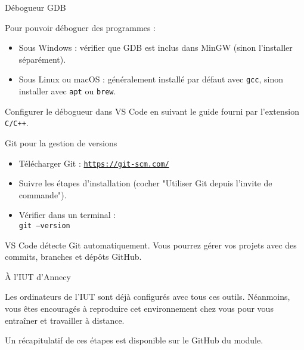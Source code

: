 \documentclass[TP, noCustomPackages]{UPSTI_Document}
\begin{document}
\begin{UPSTIinfor}{Débogueur GDB}

Pour pouvoir déboguer des programmes :
\begin{itemize}
    \item Sous Windows : vérifier que GDB est inclus dans MinGW (sinon l’installer séparément).
    \item Sous Linux ou macOS : généralement installé par défaut avec \texttt{gcc}, sinon installer avec \texttt{apt} ou \texttt{brew}.
\end{itemize}
Configurer le débogueur dans VS Code en suivant le guide fourni par l’extension \texttt{C/C++}.

\end{UPSTIinfor}

\begin{UPSTIinfor}{Git pour la gestion de versions}

\begin{itemize}
    \item Télécharger Git : \href{https://git-scm.com/}{\texttt{https://git-scm.com/}}
    \item Suivre les étapes d’installation (cocher "Utiliser Git depuis l'invite de commande").
    \item Vérifier dans un terminal :\\
    \texttt{git --version}
\end{itemize}

VS Code détecte Git automatiquement. Vous pourrez gérer vos projets avec des commits, branches et dépôts GitHub.

\end{UPSTIinfor}

\begin{UPSTIinfor}{À l'IUT d'Annecy}

Les ordinateurs de l'IUT sont déjà configurés avec tous ces outils.  
Néanmoins, vous êtes encouragés à reproduire cet environnement chez vous pour vous entraîner et travailler à distance.

Un récapitulatif de ces étapes est disponible sur le GitHub du module.

\end{UPSTIinfor}
\end{document}
